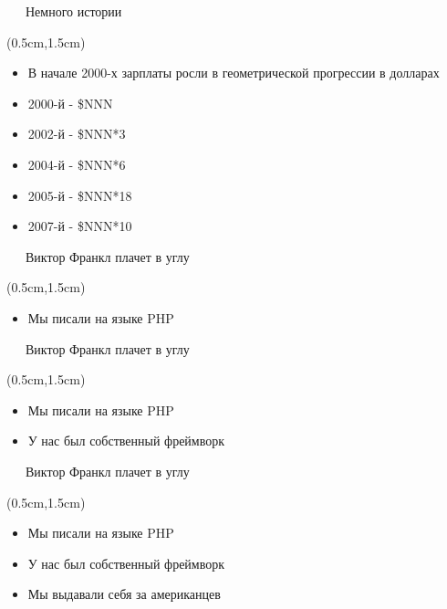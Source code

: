 \documentclass[xetex,18pt,aspectratio=43]{beamer}
\begin{document}
\begin{Large}
\begin{frame}{\ \ \ Немного истории}
\begin{textblock*}{\framewidth-0.8cm}(0.5cm,1.5cm)
\begin{itemize}
  \item В начале 2000-х зарплаты росли в геометрической прогрессии в долларах
  \item 2000-й - \$NNN
  \item 2002-й - \$NNN*3
  \item 2004-й - \$NNN*6
  \item 2005-й - \$NNN*18
  \item 2007-й - \$NNN*10
\end{itemize}
\end{textblock*}
\end{frame}

\begin{frame}{\ \ \ Виктор Франкл плачет в углу}
\begin{textblock*}{\framewidth-0.8cm}(0.5cm,1.5cm)
\begin{itemize}
  \item Мы писали на языке PHP
\end{itemize}
\end{textblock*}
\end{frame}

\begin{frame}{\ \ \ Виктор Франкл плачет в углу}
\begin{textblock*}{\framewidth-0.8cm}(0.5cm,1.5cm)
\begin{itemize}
  \item Мы писали на языке PHP
  \item У нас был собственный фреймворк
\end{itemize}
\end{textblock*}
\end{frame}

\begin{frame}{\ \ \ Виктор Франкл плачет в углу}
\begin{textblock*}{\framewidth-0.8cm}(0.5cm,1.5cm)
\begin{itemize}
  \item Мы писали на языке PHP
  \item У нас был собственный фреймворк
  \item Мы выдавали себя за американцев
\end{itemize}
\end{textblock*}
\end{frame}


\end{Large}
\end{document}
